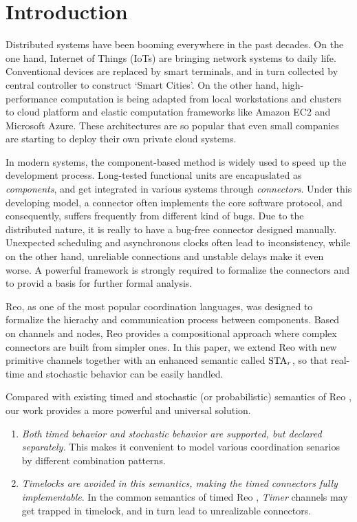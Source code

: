 \section{Introduction}
\label{sec:intro}

Distributed systems have been booming everywhere in the past decades. On the one hand, Internet of Things (IoTs) are bringing network systems to daily life. Conventional devices are replaced by smart terminals, and in turn collected by central controller to construct `Smart Cities'. On the other hand, high-performance computation is being adapted from local workstations and clusters to cloud platform and elastic computation frameworks like Amazon EC2\cite{Newcombe2015} and Microsoft Azure\cite{Li2009}. These architectures are so popular that even small companies are starting to deploy their own private cloud systems. 

In modern systems, the component-based method is widely used to speed up the development process. Long-tested functional units are encapuslated as \emph{components}, and get integrated in various systems through \emph{connectors}. Under this developing model, a connector often implements the core software protocol, and consequently, suffers frequently from different kind of bugs.
Due to the distributed nature, it is really to have a bug-free connector designed manually. Unexpected scheduling and asynchronous clocks often lead to inconsistency, while on the other hand, unreliable connections and unstable delays make it even worse. A powerful framework is strongly required to formalize the connectors and to provid a basis for further formal analysis.

Reo\cite{ARBAB2004}, as one of the most popular coordination languages, was designed to formalize the hierachy and communication process between components. Based on channels and nodes, Reo provides a compositional approach where complex connectors are built from simpler ones.
In this paper, we extend Reo with new primitive channels together with an enhanced semantic called $\mbox{STA}_r$, so that real-time and stochastic behavior can be easily handled.

Compared with existing timed and stochastic (or probabilistic) semantics of Reo \cite{Arbab2009,Baier2006,Meng2012,Meng2007}, our work provides a more powerful and universal solution. 
\begin{enumerate}
    \item \emph{Both timed behavior and stochastic behavior are supported, but declared separately.} This makes it convenient to model various coordination senarios by different combination patterns.
    \item \emph{Timelocks are avoided in this semantics, making the timed connectors fully implementable}. In the common semantics of timed Reo \cite{Arbab2006,Meng2012}, \emph{Timer} channels may get trapped in timelock, and in turn lead to unrealizable connectors.
\end{enumerate}

